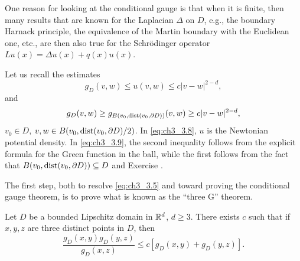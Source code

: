 One reason for looking at the conditional gauge is that when it is finite, then many results that are known for the Laplacian $\Delta$ on $D$, e.g., the boundary Harnack principle, the equivalence of the Martin boundary with the Euclidean one, etc., are then also true for the Schr\"odinger operator $Lu(x) = \Delta u(x) + q(x)u(x)$.

Let us recall the estimates
\begin{equation}\label{eq:ch3_3.8}
    g_D(v,w) \leq u(v,w) \leq c|v-w|^{2-d},
\end{equation}
and
\begin{equation}\label{eq:ch3_3.9}
    g_D(v,w) \geq g_{B(v_0,\operatorname{dist}(v_0,\partial D))}(v,w) \geq c|v-w|^{2-d},
\end{equation}
$v_0 \in D$, $v,w \in B(v_0,\operatorname{dist}(v_0,\partial D)/2)$. In \eqref{eq:ch3_3.8}, $u$ is the Newtonian potential density. In \eqref{eq:ch3_3.9}, the second inequality follows from the explicit formula for the Green function in the ball, while the first follows from the fact that $B(v_0,\operatorname{dist}(v_0,\partial D)) \subseteq D$ and Exercise .

The first step, both to resolve \eqref{eq:ch3_3.5} and toward proving the conditional gauge theorem, is to prove what is known as the ``three G'' theorem.

\begin{theorem}\label{thm:ch3_3.6}
Let $D$ be a bounded Lipschitz domain in $\mathbb{R}^d$, $d \geq 3$. There exists $c$ such that if $x,y,z$ are three distinct points in $D$, then
\begin{equation}\label{eq:ch3_3.10}
    \frac{g_D(x,y)g_D(y,z)}{g_D(x,z)} \leq c[g_D(x,y) + g_D(y,z)].
\end{equation}
\end{theorem}

